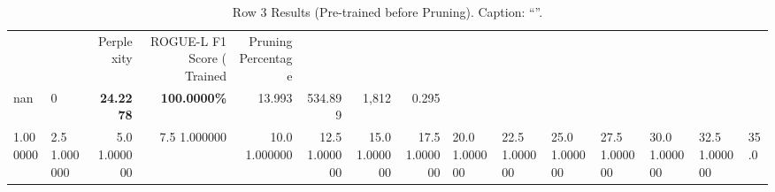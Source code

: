 \begin{table}
\caption{Row 3 Results (Pre-trained before Pruning). \ifshowcaption{}Caption: ``''.\fi}
\label{tab:evaluation-pipeline-3-trained}
\begin{tabular}{llrrrrrr}
 &  & Perplexity & ROGUE-L F1 Score (%
Trained & Pruning Percentage &  &  &  &  &  &  \\
nan & 0 & \bfseries 24.2278 & \bfseries 100.0000\% & 13.993 & 534.899 & 1,812 & 0.295 \\
1.000000 & 2.5%
1.000000 & 5.0%
1.000000 & 7.5%
1.000000 & 10.0%
1.000000 & 12.5%
1.000000 & 15.0%
1.000000 & 17.5%
1.000000 & 20.0%
1.000000 & 22.5%
1.000000 & 25.0%
1.000000 & 27.5%
1.000000 & 30.0%
1.000000 & 32.5%
1.000000 & 35.0%

\end{tabular}
\end{table}
